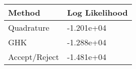 \begin{tabular}{ll}
\hline 
Method & Log Likelihood \\ 
\hline 
Quadrature & -1.201e+04 \\ 
GHK & -1.288e+04 \\ 
Accept/Reject & -1.481e+04 \\ 
\hline 
\end{tabular}